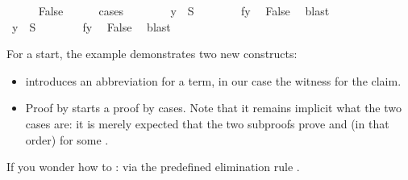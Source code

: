 \begin{isabellebody}
\isacommand{{\isachardot}{\isachardot}}\isanewline
\ \ \ \ \isamarkupfalse%
\ False\isanewline
\ \ \ \ \isamarkupfalse%
\ cases\isanewline
\ \ \ \ \ \ \isamarkupfalse%
\ {\isachardoublequote}y\ {\isasymin}\ {\isacharquery}S{\isachardoublequote}\isanewline
\ \ \ \ \ \ \isamarkupfalse%
\ fy\ \isamarkupfalse%
\ False\ \isamarkupfalse%
\ blast\isanewline
\ \ \ \ \isamarkupfalse%
\isanewline
\ \ \ \ \ \ \isamarkupfalse%
\ {\isachardoublequote}y\ {\isasymnotin}\ {\isacharquery}S{\isachardoublequote}\isanewline
\ \ \ \ \ \ \isamarkupfalse%
\ fy\ \isamarkupfalse%
\ False\ \isamarkupfalse%
\ blast\isanewline
\ \ \ \ \isamarkupfalse%
\isanewline
\ \ \isamarkupfalse%
\isanewline
\isamarkupfalse%
\isamarkupfalse%
%
\begin{isamarkuptext}%
\noindent
For a start, the example demonstrates two new constructs:
\begin{itemize}
\item {} introduces an abbreviation for a term, in our case
the witness for the claim.
\item Proof by  starts a proof by cases. Note that it remains
implicit what the two cases are: it is merely expected that the two subproofs
prove  and  (in that order)
for some .
\end{itemize}
If you wonder how to  :
via the predefined elimination rule .


\end{isamarkuptext}
\end{isabellebody}
